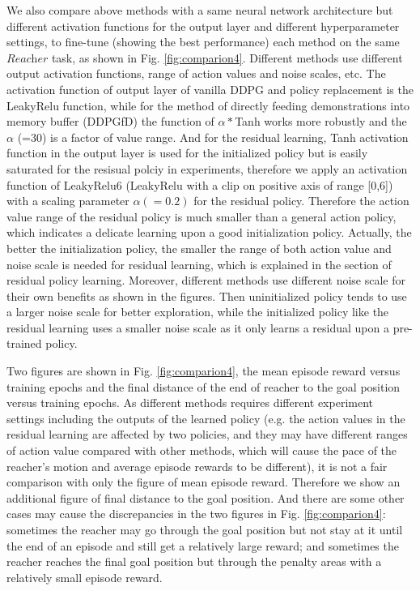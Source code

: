 \documentclass{article}
\begin{document}
We also compare above methods with a same neural network architecture but different activation functions for the output layer and different hyperparameter settings, to fine-tune (showing the best performance) each method on the same $\textit{Reacher}$ task, as shown in Fig. \ref{fig:comparion4}. Different methods use different output activation functions, range of action values and noise scales, etc. The activation function of output layer of vanilla DDPG and policy replacement is the LeakyRelu function, while for the method of directly feeding demonstrations into memory buffer (DDPGfD) the function of $\alpha*$Tanh works more robustly and the $\alpha$ (=30) is a factor of value range. And for the residual learning, Tanh activation function in the output layer is used for the initialized policy but is easily saturated for the resisual polciy in experiments, therefore we apply an activation function of LeakyRelu6 (LeakyRelu with a clip on positive axis of range [0,6]) with a scaling parameter $\alpha(=0.2)$ for the residual policy. Therefore the action value range of the residual policy is much smaller than a general action policy, which indicates a delicate learning upon a good initialization policy. Actually, the better the initialization policy, the smaller the range of both action value and noise scale is needed for residual learning, which is explained in the section of residual policy learning. Moreover, different methods use different noise scale for their own benefits as shown in the figures. Then uninitialized policy tends to use a larger noise scale for better exploration, while the initialized policy like the residual learning uses a smaller noise scale as it only learns a residual upon a pre-trained policy.

Two figures are shown in Fig. \ref{fig:comparion4}, the mean episode reward versus training epochs and the final distance of the end of reacher to the goal position versus training epochs. As different methods requires different experiment settings including the outputs of the learned policy (e.g. the action values in the residual learning are affected by two policies, and they may have different ranges of action value compared with other methods, which will cause the pace of the reacher's motion and average episode rewards to be different), it is not a fair comparison with only the figure of mean episode reward. Therefore we show an additional figure of final distance to the goal position. And there are some other cases may cause the discrepancies in the two figures in Fig. \ref{fig:comparion4}: sometimes the reacher may go through the goal position but not stay at it until the end of an episode and still get a relatively large reward; and sometimes the reacher reaches the final goal position but through the penalty areas with a relatively small episode reward.
\end{document}
